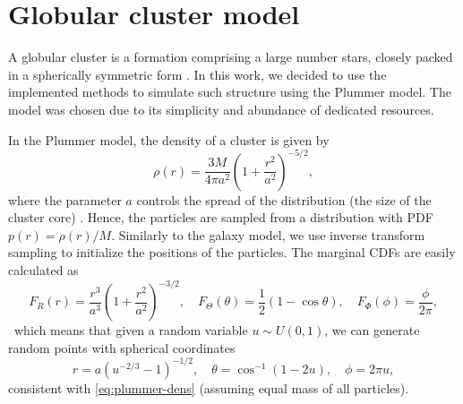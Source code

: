 \section{Globular cluster model}
A globular cluster is a formation comprising a large number stars, closely packed in a spherically symmetric form \cite{britannica2024globular}.
In this work, we decided to use the implemented methods to simulate such structure using the Plummer model.
The model was chosen due to its simplicity and abundance of dedicated resources.

In the Plummer model, the density of a cluster is given by
\begin{equation}\label{eq:plummer-dens}
    \rho(r) = \frac{3M}{4\pi a^2}\left(1 + \frac{r^2}{a^2} \right)^{-5/2},
\end{equation}
where the parameter $a$ controls the spread of the distribution (the size of the cluster core) \cite{Aarseth1974Comparison}.
Hence, the particles are sampled from a distribution with PDF $p(r) = \rho(r) / M$.
Similarly to the galaxy model, we use inverse transform sampling to initialize the positions of the particles.
The marginal CDFs are easily calculated as
\begin{equation*}
    F_R(r) = \frac{r^3}{a^3}\left( 1+\frac{r^2}{a^2} \right)^{-3/2}, \quad
    F_\Theta (\theta) = \frac{1}{2}(1-\cos\theta), \quad
    F_\Phi (\phi) = \frac{\phi}{2\pi},
\end{equation*}\
which means that given a random variable $u\sim U(0, 1)$, we can generate random points with spherical coordinates
\begin{equation}\label{eq:plummer-random-init-pos}
    r = a(u^{-2/3}-1)^{-1/2}, \quad \theta = \cos^{-1}(1-2u), \quad \phi = 2\pi u,
\end{equation}
consistent with \autoref{eq:plummer-dens} (assuming equal mass of all particles).


